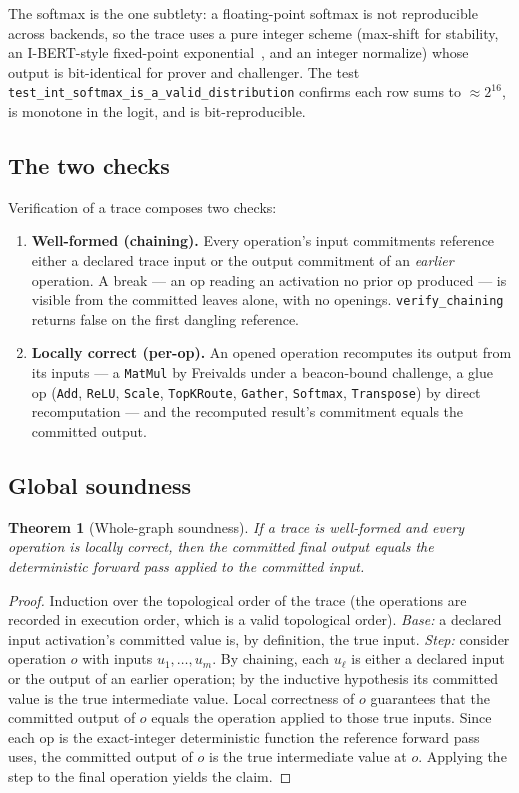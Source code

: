 \documentclass[11pt,a4paper]{article}
\newtheorem{theorem}{Theorem}
\begin{document}
The softmax is the one subtlety: a floating-point softmax is not reproducible across backends, so the trace uses a pure integer scheme (max-shift for stability, an I-BERT-style fixed-point exponential~\cite{ibert}, and an integer normalize) whose output is bit-identical for prover and challenger. The test \texttt{test\_int\_softmax\_is\_a\_valid\_distribution} confirms each row sums to $\approx 2^{16}$, is monotone in the logit, and is bit-reproducible.

\subsection{The two checks}

Verification of a trace composes two checks:
\begin{enumerate}
  \item \textbf{Well-formed (chaining).} Every operation's input commitments reference either a declared trace input or the output commitment of an \emph{earlier} operation. A break --- an op reading an activation no prior op produced --- is visible from the committed leaves alone, with no openings. \texttt{verify\_chaining} returns false on the first dangling reference.
  \item \textbf{Locally correct (per-op).} An opened operation recomputes its output from its inputs --- a \texttt{MatMul} by Freivalds under a beacon-bound challenge, a glue op (\texttt{Add}, \texttt{ReLU}, \texttt{Scale}, \texttt{TopKRoute}, \texttt{Gather}, \texttt{Softmax}, \texttt{Transpose}) by direct recomputation --- and the recomputed result's commitment equals the committed output.
\end{enumerate}

\subsection{Global soundness}

\begin{theorem}[Whole-graph soundness]\label{thm:graph}
If a trace is well-formed and every operation is locally correct, then the committed final output equals the deterministic forward pass applied to the committed input.
\end{theorem}

\begin{proof}
Induction over the topological order of the trace (the operations are recorded in execution order, which is a valid topological order). \emph{Base:} a declared input activation's committed value is, by definition, the true input. \emph{Step:} consider operation $o$ with inputs $u_1, \dots, u_m$. By chaining, each $u_\ell$ is either a declared input or the output of an earlier operation; by the inductive hypothesis its committed value is the true intermediate value. Local correctness of $o$ guarantees that the committed output of $o$ equals the operation applied to those true inputs. Since each op is the exact-integer deterministic function the reference forward pass uses, the committed output of $o$ is the true intermediate value at $o$. Applying the step to the final operation yields the claim.
\end{proof}
\end{document}
